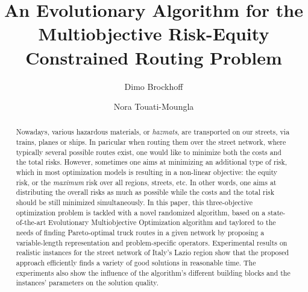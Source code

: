 \documentclass[preprint,12pt]{elsarticle}
\begin{document}
\begin{frontmatter}



\title{An Evolutionary Algorithm for the Multiobjective Risk-Equity Constrained Routing Problem}


\author{Dimo Brockhoff}
\address{INRIA Lille - Nord Europe, DOLPHIN team, 59650 Villeneuve d'Ascq, France\\
{\upshape \url{dimo.brockhoff@inria.fr}}}

\author{Nora Touati-Moungla}
\address{Laboratoire d'Informatique, \'{E}cole Polytechnique, 91128 Palaiseau Cedex, France\\
{\upshape \url{touati@lix.polytechnique.fr}}}



\begin{abstract}
Nowadays, various hazardous materials, or \emph{hazmats}, are transported on our streets, via trains, planes or ships. In paricular when routing them over the street network, where typically several possible routes exist, one would like to minimize both the costs and the total risks. However, sometimes one aims at minimizing an additional type of risk, which in most optimization models is resulting in a non-linear objective: the equity risk, or the \emph{maximum} risk over all regions, streets, etc. In other words, one aims at distributing the overall risks as much as possible while the costs and the total risk should be still minimized simultaneously. In this paper, this three-objective optimization problem is tackled with a novel randomized algorithm, based on a state-of-the-art Evolutionary Multiobjective Optimization algorithm and taylored to the needs of finding Pareto-optimal truck routes in a given network by proposing a variable-length representation and problem-specific operators. Experimental results on realistic instances for the street network of Italy's Lazio region show that the proposed approach efficiently finds a variety of good solutions in reasonable time. The experiments also show the influence of the algorithm's different building blocks and the instances' parameters on the solution quality.
\end{abstract}


\end{frontmatter}
\end{document}
